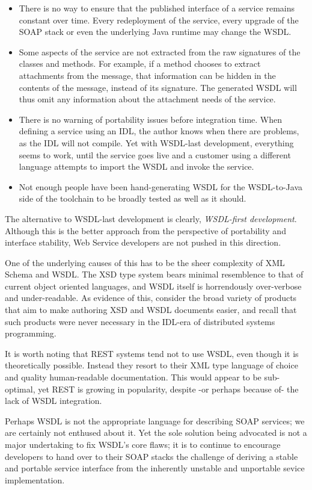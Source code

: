 \begin{itemize}

\item
    There is no way to ensure that the published interface of a service
    remains constant over time. Every redeployment of the service, every
    upgrade of the SOAP stack or even the underlying Java runtime may
    change the WSDL.

\item

Some aspects of the service are not extracted from the raw signatures
of the classes and methods. For example, if a method chooses to extract
attachments from the message, that information can be hidden in the contents
of the message, instead of its signature. The generated WSDL will thus
omit any information about the attachment needs of the service.

\item

There is no warning of portability issues before integration time. 
When defining a service using an IDL, the author knows
when there are problems, as the IDL will not compile. Yet with WSDL-last
development, everything seems to work, until the service goes live and
a customer using a different language attempts to import the WSDL and
invoke the service.

\item

Not enough people have been hand-generating WSDL for the WSDL-to-Java
side of the toolchain to be broadly tested as well as it should.

    
\end{itemize}

The alternative to WSDL-last development is clearly, \emph{WSDL-first
development}. Although this is the better approach from the perspective
of portability and interface stability, Web Service developers are not
pushed in this direction.

One of the underlying causes of this has to be the sheer complexity of
XML Schema and WSDL. The XSD type system bears minimal resemblence to
that of current object oriented languages, and WSDL itself is
horrendously over-verbose and under-readable. As evidence of this, 
consider the broad variety of products that aim to make authoring XSD
and WSDL documents easier, and recall that such products were never
necessary in the IDL-era of distributed systems programming.

It is worth noting that REST systems \cite{fielding:rest} tend not to
use WSDL, even though it is theoretically possible. Instead they resort
to their XML type language of choice and quality human-readable
documentation. This would appear to be sub-optimal, yet REST is growing
in popularity, despite -or perhaps because of- the lack of WSDL
integration. 

Perhaps WSDL is not the appropriate language for
describing SOAP services; we are certainly not enthused about it. Yet
the sole solution being advocated is not a major undertaking to fix
WSDL's core flaws; it is to continue to encourage developers to hand
over to their SOAP stacks the challenge of deriving a stable and portable 
service interface from the inherently unstable and unportable sevice
implementation.   
